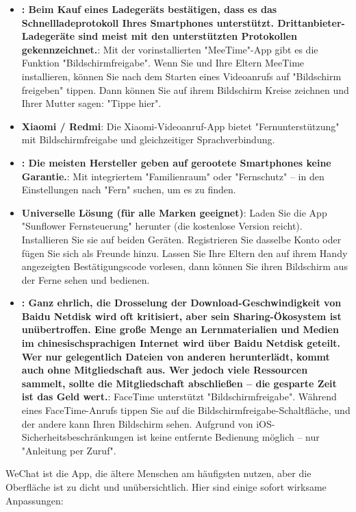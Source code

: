 \begin{itemize}
  \item \textbf{: Beim Kauf eines Ladegeräts bestätigen, dass es das Schnellladeprotokoll Ihres Smartphones unterstützt. Drittanbieter-Ladegeräte sind meist mit den unterstützten Protokollen gekennzeichnet.}: Mit der vorinstallierten "MeeTime"-App gibt es die Funktion "Bildschirmfreigabe". Wenn Sie und Ihre Eltern MeeTime installieren, können Sie nach dem Starten eines Videoanrufs auf "Bildschirm freigeben" tippen. Dann können Sie auf ihrem Bildschirm Kreise zeichnen und Ihrer Mutter sagen: "Tippe hier".
  \item \textbf{Xiaomi / Redmi}: Die Xiaomi-Videoanruf-App bietet "Fernunterstützung" mit Bildschirmfreigabe und gleichzeitiger Sprachverbindung.
  \item \textbf{: Die meisten Hersteller geben auf gerootete Smartphones keine Garantie.}: Mit integriertem "Familienraum" oder "Fernschutz" – in den Einstellungen nach "Fern" suchen, um es zu finden.
  \item \textbf{Universelle Lösung (für alle Marken geeignet)}: Laden Sie die App "Sunflower Fernsteuerung" herunter (die kostenlose Version reicht). Installieren Sie sie auf beiden Geräten. Registrieren Sie dasselbe Konto oder fügen Sie sich als Freunde hinzu. Lassen Sie Ihre Eltern den auf ihrem Handy angezeigten Bestätigungscode vorlesen, dann können Sie ihren Bildschirm aus der Ferne sehen und bedienen.
  \item \textbf{: Ganz ehrlich, die Drosselung der Download-Geschwindigkeit von Baidu Netdisk wird oft kritisiert, aber sein Sharing-Ökosystem ist unübertroffen. Eine große Menge an Lernmaterialien und Medien im chinesischsprachigen Internet wird über Baidu Netdisk geteilt. Wer nur gelegentlich Dateien von anderen herunterlädt, kommt auch ohne Mitgliedschaft aus. Wer jedoch viele Ressourcen sammelt, sollte die Mitgliedschaft abschließen – die gesparte Zeit ist das Geld wert.}: FaceTime unterstützt "Bildschirmfreigabe". Während eines FaceTime-Anrufs tippen Sie auf die Bildschirmfreigabe-Schaltfläche, und der andere kann Ihren Bildschirm sehen. Aufgrund von iOS-Sicherheitsbeschränkungen ist keine entfernte Bedienung möglich – nur "Anleitung per Zuruf".
\end{itemize}


WeChat ist die App, die ältere Menschen am häufigsten nutzen, aber die Oberfläche ist zu dicht und unübersichtlich. Hier sind einige sofort wirksame Anpassungen:

